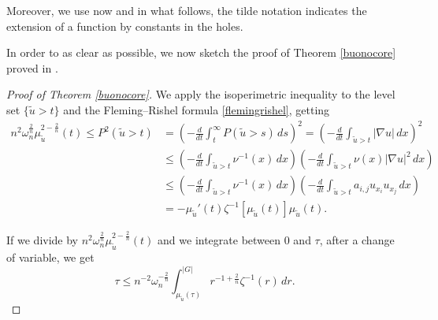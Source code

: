 \documentclass[oneside,a4paper,11pt,notitlepage]{article}
\newcommand{\abs}[1]{{\left|#1\right|}}
\theoremstyle{definition}
\theoremstyle{plain}
\theoremstyle{definition}
\begin{document}
Moreover, we use now and in what follows, the tilde notation indicates the extension of a function by constants in the holes.

In order to as clear as possible, we now sketch the proof of Theorem \ref{buonocore} proved in \cite{B}.

\begin{proof}[Proof of Theorem \ref{buonocore}]
    We apply the isoperimetric inequality to the level set $\{\tilde{u}>t\}$ and the Fleming--Rishel formula \eqref{flemingrishel},  getting 
\begin{equation}\label{buonocoreisoperimetrica1}
    \begin{aligned}
      n^2\omega_n^{\frac{2}{n}}\mu_{\tilde u}^{2-\frac{2}{n}}(t) \leq  P^2(\tilde u>t)&=\left(-\frac{d}{dt}\int_t^\infty P(\tilde u>s)\,ds\right)^2=\left(-\frac{d}{dt}\int_{\tilde u>t}\abs{\nabla u}\,dx\right)^2\\&\leq\left(-\frac{d}{dt}\int_{\tilde u>t}\nu^{-1}(x)\,dx\right)\left(-\frac{d}{dt}\int_{\tilde u>t}\nu(x)\abs{\nabla u}^2\, dx\right)\\&\leq\left(-\frac{d}{dt}\int_{\tilde u>t}\nu^{-1}(x)\,dx\right)\left(-\frac{d}{dt}\int_{\tilde u>t}a_{i,j} u_{x_i}u_{x_j}\, dx\right)\\&= -\mu_{\tilde u}'(t) \zeta^{-1}[\mu_{\tilde u}(t)] \mu_{\tilde u}(t).
    \end{aligned}
    \end{equation}
  
    If we divide by $n^2\omega_n^{\frac{2}{n} }\mu_{\tilde u}^{2-\frac{2}{n}}(t)$ and we integrate between $0$ and $\tau$, after a change of variable, we get
    \begin{equation*}
            \tau\leq n^{-2}\omega_n^{-\frac{2}{n}}\int_{\mu_{\tilde u}(\tau)}^{\abs{G}}r^{-1+\frac{2}{n}}\zeta^{-1}(r)\,dr.
    \end{equation*}
    

\end{proof}
\end{document}
